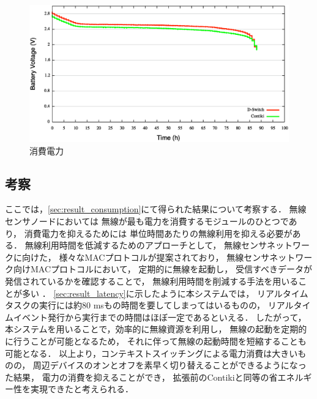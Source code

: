 \begin{figure}[htbp]
 \begin{center}
  \includegraphics[width=130mm]{./images/power_consumption.eps}
 \end{center}
 \caption{消費電力}
 \label{fig:power_consumption}
\end{figure}



\subsection{考察}
ここでは，\ref{sec:result_consumption}にて得られた結果について考察する．
無線センサノードにおいては
無線が最も電力を消費するモジュールのひとつであり，
消費電力を抑えるためには
単位時間あたりの無線利用を抑える必要がある．
無線利用時間を低減するためのアプローチとして，
無線センサネットワークに向けた，
様々なMACプロトコルが提案されており，
無線センサネットワーク向けMACプロトコルにおいて，
定期的に無線を起動し，
受信すべきデータが発信されているかを確認することで，
無線利用時間を削減する手法を用いることが多い
\cite{polastre2004versatile}．
\ref{sec:result_latency}に示したように本システムでは，
リアルタイムタスクの実行には約80 msもの時間を要してしまってはいるものの，
リアルタイムイベント発行から実行までの時間はほぼ一定であるといえる．
したがって，本システムを用いることで，効率的に無線資源を利用し，
無線の起動を定期的に行うことが可能となるため，
それに伴って無線の起動時間を短縮することも可能となる．
以上より，コンテキストスイッチングによる電力消費は大きいものの，
周辺デバイスのオンとオフを素早く切り替えることができるようになった結果，
電力の消費を抑えることができ，
拡張前のContikiと同等の省エネルギー性を実現できたと考えられる．

